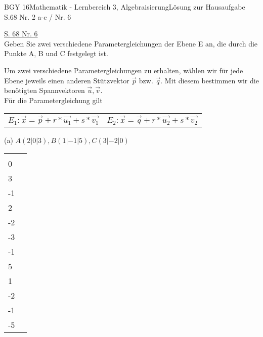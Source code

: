 \documentclass[oneside,openany,headings=optiontotoc,11pt,numbers=noenddot]{scrreprt}
\begin{document}
\begin{worksheet}{BGY 16}{Mathematik - Lernbereich 3, Algebraisierung}{Lösung zur Hausaufgabe S.68 Nr. 2 a-c / Nr. 6}
		\begin{framed}
			\noindent
			\tiny{\color{codegray}\underline{S. 68 Nr. 6}}\\
			Geben Sie zwei verschiedene Parametergleichungen der Ebene E an, die durch die Punkte A, B und C festgelegt ist.\\
			\par\bigskip\noindent
			\begin{framed}
				\noindent
				Um zwei verschiedene Parametergleichungen zu erhalten, wählen wir für jede Ebene jeweils einen anderen Stützvektor \(\vec{p}\) bzw. \(\vec{q}\). Mit diesem bestimmen wir die benötigten Spannvektoren \(\vec{u}, \vec{v}\).\\
				Für die Parametergleichung gilt\\
				\begin{tabularx}{\textwidth}{X|X}
					\(E_1: \vec{x} = \vec{p} + r*\vec{u_1} + s*\vec{v_1}\) & \(E_2: \vec{x} = \vec{q} + r*\vec{u_2} + s*\vec{v_2}\)
				\end{tabularx}
			\end{framed}
			\noindent
			(a) \(A(2|0|3), B(1|-1|5), C(3|-2|0)\)\\
			\begin{tabularx}{\textwidth}{X|X}
				\(\vec{p} = \vec{0A} = \left(\begin{matrix}2\\0\\3\end{matrix}\right), \vec{u_1} = \vec{AB} = \left(\begin{matrix}-1\\-1\\2\end{matrix}\right), \vec{v_1} = \vec{AC} = \left(\begin{matrix}1\\-2\\-3\end{matrix}\right)\) & \(\vec{q} = \vec{0B} =  \left(\begin{matrix}1\\-1\\5\end{matrix}\right), \vec{u_2} = \vec{BA} = \left(\begin{matrix}1\\1\\-2\end{matrix}\right), \vec{v_2} = \vec{BC} = \left(\begin{matrix}2\\-1\\-5\end{matrix}\right)\)\\

\end{tabularx}
\end{framed}
\end{worksheet}
\end{document}
